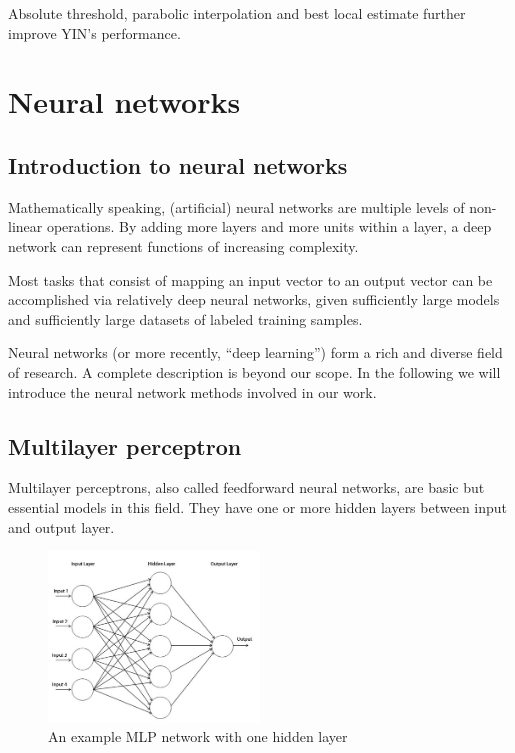 \documentclass[11pt,a4paper]{report}
\begin{document}
Absolute threshold, parabolic interpolation and best local estimate further improve YIN's performance.

\newpage

\section{Neural networks}

\subsection{Introduction to neural networks}

Mathematically speaking, (artificial) neural networks are multiple levels of non-linear operations.
By adding more layers and more units within a layer, a deep network can represent functions of increasing complexity.

Most tasks that consist of mapping an input vector to an output vector can be accomplished via relatively deep neural networks, given sufficiently large models and sufficiently large datasets of labeled training samples.

Neural networks (or more recently, \enquote{deep learning}) form a rich and diverse field of research.
A complete description is beyond our scope.
In the following we will introduce the neural network methods involved in our work.

\subsection{Multilayer perceptron}

Multilayer perceptrons, also called feedforward neural networks, are basic but essential models in this field.
They have one or more hidden layers between input and output layer.

\begin{figure}[htbp]
  \centering
  \includegraphics[width=0.5\textwidth]{mlp-example.jpg}
  \caption{An example MLP network with one hidden layer} \label{fig:mlp-example}
\end{figure}
\end{document}
